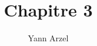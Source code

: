 \documentclass{article}
\begin{document}
\title{Chapitre 3}
\author{Yann Arzel}

\maketitle
	

\end{document}
